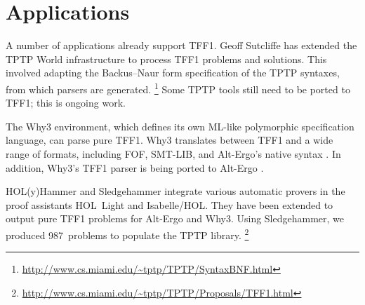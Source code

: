 \section{Applications}
\label{sec_apps}

A number of applications already support TFF1. Geoff
Sutcliffe has extended the TPTP World infrastructure to process TFF1 problems
and solutions. This involved adapting the Backus--Naur form specification of the
TPTP syntaxes, from which parsers are generated.%
\footnote{\url{http://www.cs.miami.edu/~tptp/TPTP/SyntaxBNF.html}}
Some TPTP tools still need to be ported to TFF1; this is ongoing work.

The Why3 \cite{bobot-et-al-2011} environment, which defines its own ML-like
polymorphic specification language, can parse pure TFF1. Why3 translates
between TFF1 and a wide range of
formats, including FOF, SMT-LIB, and
Alt-Ergo's native syntax \cite{couchot-lescuyer-2007,bobot-paskevich-2011}.
In addition, Why3's TFF1 parser is being ported to
Alt-Ergo \cite{bobot-et-al-2008}. %

HOL(y)Hammer \cite{kaliszyk-urban-2013}
and Sledgehammer \cite{paulson-blanchette-2010}
integrate various automatic provers
in the proof assistants HOL~Light and Isabelle\slash HOL. They have been
extended to output pure TFF1 problems for Alt-Ergo and Why3.
Using Sledgehammer, we produced 987~problems to populate the TPTP library.%
\footnote{\url{http://www.cs.miami.edu/~tptp/TPTP/Proposals/TFF1.html}}



